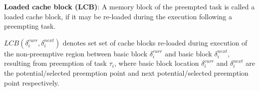 \begin{definition}
\textbf{Loaded cache block (LCB)}: A memory block of the preempted task is called a loaded cache block, if it may be re-loaded during the execution following a preempting task.
\end{definition}
\noindent
\begin{math}\textit{LCB}(\delta_{i}^{curr},\delta_{i}^{next})\end{math} denotes set set of cache blocks re-loaded during execution of the non-preemptive region between basic block \begin{math}\delta_{i}^{curr}\end{math} and basic block \begin{math}\delta_{i}^{next}\end{math}, resulting from preemption of task \begin{math}\tau_{i}\end{math}, where basic block location \begin{math}\delta_{i}^{curr}\end{math} and \begin{math}\delta_{i}^{next}\end{math} are the potential/selected preemption point and next potential/selected preemption point respectively.

